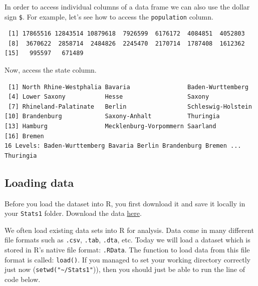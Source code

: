 \documentclass[]{book}
\newenvironment{Shaded}{\begin{snugshade}}{\end{snugshade}}
\newcommand{\OperatorTok}[1]{\textcolor[rgb]{0.81,0.36,0.00}{\textbf{#1}}}
\newcommand{\NormalTok}[1]{#1}
\theoremstyle{definition}
\theoremstyle{definition}
\theoremstyle{definition}
\theoremstyle{remark}
\begin{document}
In order to access individual columns of a data frame we can also use
the dollar sign \texttt{\$}. For example, let's see how to access the
\texttt{population} column.

\begin{Shaded}
\end{Shaded}

\begin{verbatim}
 [1] 17865516 12843514 10879618  7926599  6176172  4084851  4052803
 [8]  3670622  2858714  2484826  2245470  2170714  1787408  1612362
[15]   995597   671489
\end{verbatim}

Now, access the state column.

\begin{Shaded}
\end{Shaded}

\begin{verbatim}
 [1] North Rhine-Westphalia Bavaria                Baden-Wurttemberg     
 [4] Lower Saxony           Hesse                  Saxony                
 [7] Rhineland-Palatinate   Berlin                 Schleswig-Holstein    
[10] Brandenburg            Saxony-Anhalt          Thuringia             
[13] Hamburg                Mecklenburg-Vorpommern Saarland              
[16] Bremen                
16 Levels: Baden-Wurttemberg Bavaria Berlin Brandenburg Bremen ... Thuringia
\end{verbatim}

\subsection{Loading data}\label{loading-data}

Before you load the dataset into R, you first download it and save it
locally in your \texttt{Stats1} folder. Download the data
\href{http://philippbroniecki.github.io/ML2017.io/data/BSAS_manip.RData}{here}.

We often load existing data sets into R for analysis. Data come in many
different file formats such as \texttt{.csv}, \texttt{.tab},
\texttt{.dta}, etc. Today we will load a dataset which is stored in R's
native file format: \texttt{.RData}. The function to load data from this
file format is called: \texttt{load()}. If you managed to set your
working directory correctly just now
(\texttt{setwd("\textasciitilde{}/Stats1"})), then you should just be
able to run the line of code below.
\end{document}
